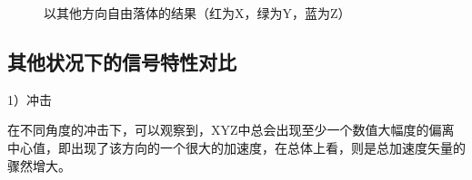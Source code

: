 \begin{figure}[htbp]
\centering

%
%

\centering
\caption{以其他方向自由落体的结果（红为X，绿为Y，蓝为Z）}\label{fig:6.1.4}
\end{figure}

\subsection{其他状况下的信号特性对比}
\par{1）冲击}
\par{在不同角度的冲击下，可以观察到，XYZ中总会出现至少一个数值大幅度的偏离中心值，即出现了该方向的一个很大的加速度，在总体上看，则是总加速度矢量的骤然增大。
}

